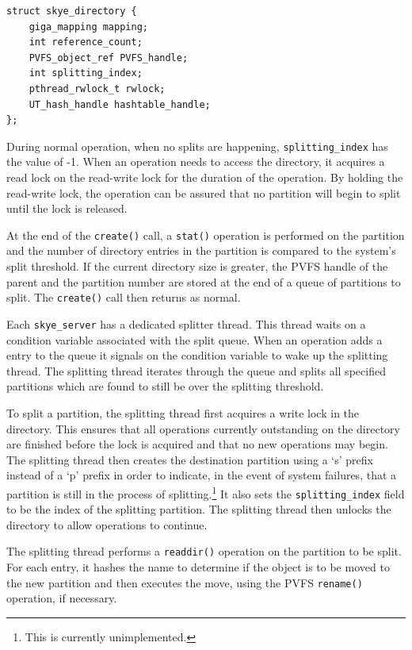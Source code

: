 \documentclass[letterpaper]{article}
\newcommand{\code}[1]{\texttt{#1}}
\begin{document}
\begin{lstlisting}
struct skye_directory {
    giga_mapping mapping;
    int reference_count;
    PVFS_object_ref PVFS_handle;
    int splitting_index;
    pthread_rwlock_t rwlock;
    UT_hash_handle hashtable_handle;
};
\end{lstlisting}

During normal operation, when no splits are happening,
\code{splitting\_\-index} has the value of -1.  When an operation needs to
access the directory, it acquires a read lock on the read-write lock for the
duration of the operation.  By holding the read-write lock, the operation can
be assured that no partition will begin to split until the lock is released.

At the end of the \code{create()} call, a \code{stat()} operation is performed
on the partition and the number of directory entries in the partition is
compared to the system's split threshold.  If the current directory size is
greater, the PVFS handle of the parent and the partition number are stored at
the end of a queue of partitions to split.  The \code{create()} call then
returns as normal.

Each \code{skye\_\-server} has a dedicated splitter thread.  This thread waits on a
condition variable associated with the split queue.  When an operation adds a
entry to the queue it signals on the condition variable to wake up the splitting
thread.  The splitting thread iterates through the queue and splits all
specified partitions which are found to still be over the splitting threshold.

To split a partition, the splitting thread first acquires a write lock in the
directory.  This ensures that all operations currently outstanding on the
directory are finished before the lock is acquired and that no new operations
may begin.  The splitting thread then creates the destination partition using a
`s' prefix instead of a `p' prefix in order to indicate, in the event of system
failures, that a partition is still in the process of splitting.\footnote{This
is currently unimplemented.}  It also sets the \code{splitting\_\-index} field
to be the index of the splitting partition.  The splitting thread then unlocks
the directory to allow operations to continue.

The splitting thread performs a \code{readdir()} operation on the partition to be
split.  For each entry, it hashes the name to determine if the object is to be
moved to the new partition and then executes the move, using the PVFS
\code{rename()} operation, if necessary.
\end{document}
